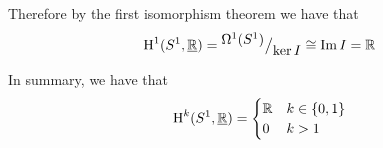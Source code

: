 \documentclass[../../main]{subfiles}
\begin{document}
\begin{example}
  Therefore by the first isomorphism theorem we have that
  \begin{equation*}
    \operatorname{H}^{1}(S^{1}, \underline{\mathbb{R}}) = {^{\textstyle \Omega^{1}(S^{1})}\big/_{\textstyle \ker I}} \cong \operatorname*{Im} I = \mathbb{R}
  \end{equation*}

  In summary, we have that
  \begin{align*}
    \operatorname{H}^{k}(S^{1}, \underline{\mathbb{R}}) = \begin{cases}
      \mathbb{R} & k \in \{0, 1\} \\
      0 & k > 1
    \end{cases}
  \end{align*}
\end{example}
\end{document}
